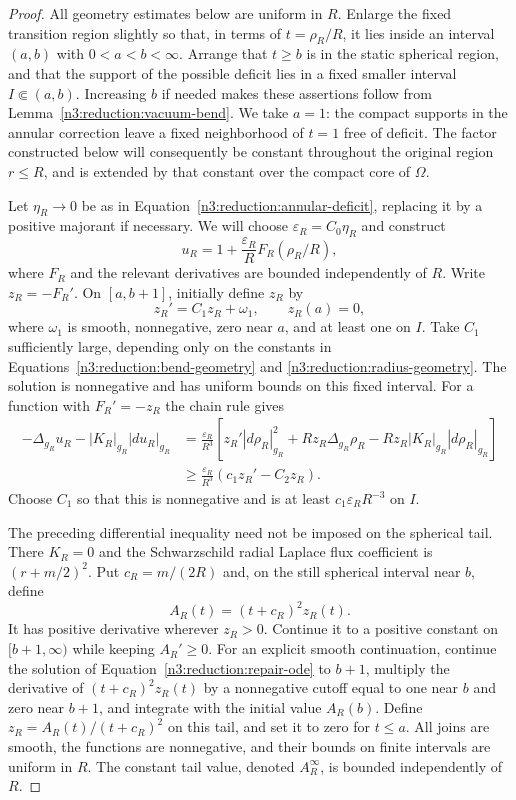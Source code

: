 \begin{proof}
All geometry estimates below are uniform in $R$.  Enlarge the fixed
transition region slightly so that, in terms of $t=\rho_R/R$, it lies
inside an interval $(a,b)$ with $0<a<b<\infty$.  Arrange that $t\ge b$
is in the static spherical region, and that the support of the possible
deficit lies in a fixed smaller interval $I\Subset(a,b)$.  Increasing
$b$ if needed makes these assertions follow from
Lemma~\ref{n3:reduction:vacuum-bend}.
We take $a=1$: the compact supports in the annular correction leave
a fixed neighborhood of $t=1$ free of deficit.  The factor constructed
below will consequently be constant throughout the original region
$r\le R$, and is extended by that constant over the compact core of $\Omega$.

Let $\eta_R\to0$ be as in
Equation~\eqref{n3:reduction:annular-deficit}, replacing it by a positive
majorant if necessary.  We will choose $\varepsilon_R=C_0\eta_R$ and
construct
\[
 u_R=1+\frac{\varepsilon_R}{R}F_R(\rho_R/R),
\]
where $F_R$ and the relevant derivatives are bounded independently of
$R$.  Write $z_R=-F_R'$.  On $[a,b+1]$, initially define $z_R$ by
\begin{equation}
 \label{n3:reduction:repair-ode}
 z_R'=C_1z_R+\omega_1,
 \qquad z_R(a)=0,
\end{equation}
where $\omega_1$ is smooth, nonnegative, zero near $a$, and at least one
on $I$.  Take $C_1$ sufficiently large, depending only on the constants
in Equations~\eqref{n3:reduction:bend-geometry} and
\eqref{n3:reduction:radius-geometry}.  The solution is nonnegative and
has uniform bounds on this fixed interval.  For a function with
$F_R'=-z_R$ the chain rule gives
\begin{align*}
 -\Delta_{g_R}u_R-|K_R|_{g_R}|du_R|_{g_R}
 &=\frac{\varepsilon_R}{R^3}
   \left[z_R'|d\rho_R|_{g_R}^2
       +Rz_R\Delta_{g_R}\rho_R
       -Rz_R|K_R|_{g_R}|d\rho_R|_{g_R}\right]\\
 &\ge\frac{\varepsilon_R}{R^3}
       (c_1z_R'-C_2z_R).
\end{align*}
Choose $C_1$ so that this is nonnegative and is at least
$c_1\varepsilon_RR^{-3}$ on $I$.

The preceding differential inequality need not be imposed on the
spherical tail.  There $K_R=0$ and the Schwarzschild radial Laplace flux
coefficient is $(r+m/2)^2$.  Put $c_R=m/(2R)$ and, on the still spherical
interval near $b$, define
\[
 A_R(t)=(t+c_R)^2z_R(t).
\]
It has positive derivative wherever $z_R>0$.  Continue it to a positive
constant on $[b+1,\infty)$ while keeping $A_R'\ge0$.  For an explicit
smooth continuation, continue the solution of
Equation~\eqref{n3:reduction:repair-ode} to $b+1$, multiply the derivative
of $(t+c_R)^2z_R(t)$ by a nonnegative cutoff equal to one near $b$ and
zero near $b+1$, and integrate with the initial value $A_R(b)$.
Define $z_R=A_R(t)/(t+c_R)^2$ on this tail, and set it to zero for
$t\le a$.  All joins are smooth, the functions are nonnegative, and
their bounds on finite intervals are uniform in $R$.  The constant
tail value, denoted $A_R^\infty$, is bounded independently of $R$.


\end{proof}
